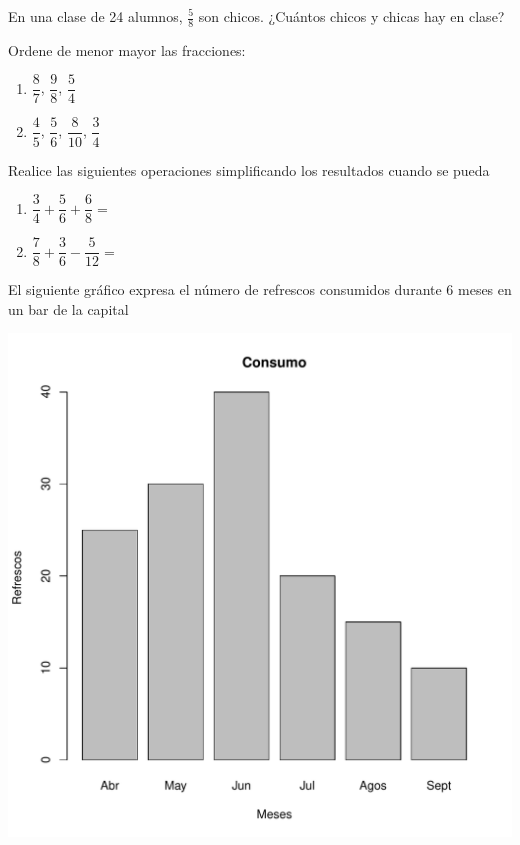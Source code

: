\documentclass[letterpaper,fleqn]{article}
\begin{document}
\begin{enumerate}
\begin{minipage}{.35\textwidth}
\end{minipage}
\item En una clase de 24 alumnos, $\frac{5}{8}$ son chicos. ¿Cuántos chicos y chicas hay en clase?\noanswer[72pt]
\item Ordene de menor  mayor las fracciones:
\begin{enumerate}
\item $\dfrac{8}{7}$, $\dfrac{9}{8}$, $\dfrac{5}{4}$\noanswer[20pt]
\item $\dfrac{4}{5}$, $\dfrac{5}{6}$, $\dfrac{8}{10}$, $\dfrac{3}{4}$\noanswer[20pt]
\end{enumerate}
\item Realice las siguientes operaciones simplificando los resultados cuando se pueda
\begin{enumerate}
\item $\dfrac{3}{4}+\dfrac{5}{6}+\dfrac{6}{8}=$\noanswer[20pt]
\item $\dfrac{7}{8}+\dfrac{3}{6}-\dfrac{5}{12}=$\noanswer[20pt]
\end{enumerate}
\begin{minipage}{.5\textwidth}
\item El siguiente gr\'{a}fico expresa el n\'{u}mero de refrescos consumidos durante 6 meses en un bar de la capital
\end{minipage} \hfill
\begin{minipage}{.55\textwidth}
\includegraphics[scale=.45]{Images/refrescosgraf.pdf} 

\end{minipage}
\end{enumerate}
\end{document}
